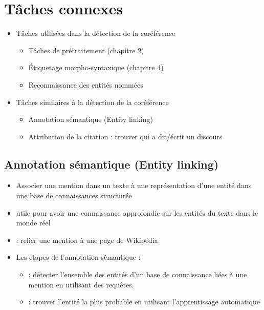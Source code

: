 \documentclass{KodeBook}
\begin{document}
\section{Tâches connexes}

\begin{itemize}
	\item Tâches utilisées dans la détection de la coréférence
	\begin{itemize}
		\item Tâches de prétraitement (chapitre 2)
		\item Étiquetage morpho-syntaxique (chapitre 4)
		\item Reconnaissance des entités nommées
	\end{itemize}
	\item Tâches similaires à la détection de la coréférence
	\begin{itemize}
		\item Annotation sémantique (Entity linking)
		\item Attribution de la citation : trouver qui a dit/écrit un discours
	\end{itemize}
\end{itemize}

\subsection{Annotation sémantique (Entity linking)}

\begin{itemize}
	\item Associer une mention dans un texte à une représentation d'une entité dans une base de connaissances structurée
	\item utile pour avoir une connaissance approfondie sur les entités du texte dans le monde réel
	\item {} : relier une mention à une page de Wikipédia
	\item Les étapes de l'annotation sémantique : 
	\begin{itemize}
		\item {} : détecter l'ensemble des entités d'un base de connaissance liées à une mention en utilisant des requêtes.
		\item {} : trouver l'entité la plus probable en utilisant l'apprentissage automatique
	\end{itemize}
\end{itemize}
\end{document}
